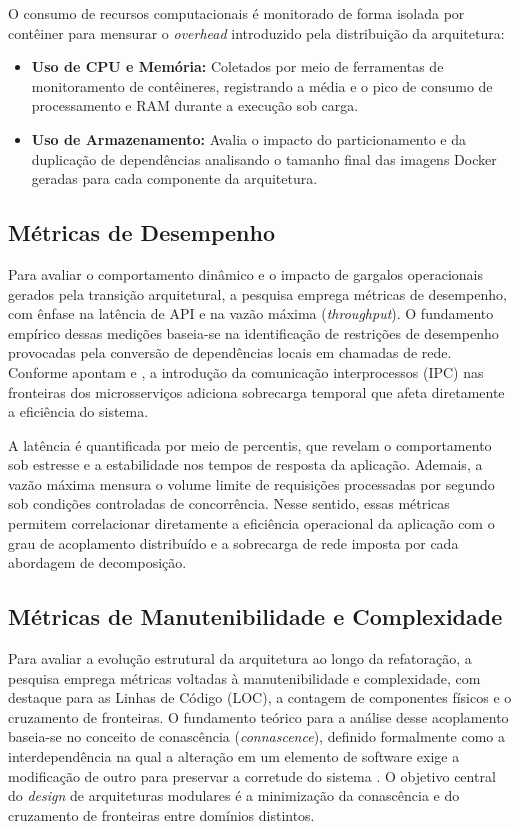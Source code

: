 O consumo de recursos computacionais é monitorado de forma isolada por contêiner para mensurar o \textit{overhead} introduzido pela distribuição da arquitetura:
\begin{itemize}
    \item \textbf{Uso de CPU e Memória:} Coletados por meio de ferramentas de monitoramento de contêineres, registrando a média e o pico de consumo de processamento e RAM durante a execução sob carga.
    \item \textbf{Uso de Armazenamento:} Avalia o impacto do particionamento e da duplicação de dependências analisando o tamanho final das imagens Docker geradas para cada componente da arquitetura.
\end{itemize}

\subsection{Métricas de Desempenho}

Para avaliar o comportamento dinâmico e o impacto de gargalos operacionais gerados pela transição arquitetural, a pesquisa emprega métricas de desempenho, com ênfase na latência de API e na vazão máxima (\textit{throughput}). O fundamento empírico dessas medições baseia-se na identificação de restrições de desempenho provocadas pela conversão de dependências locais em chamadas de rede. Conforme apontam \textcite{richardson2018} e \textcite{newman2020}, a introdução da comunicação interprocessos (IPC) nas fronteiras dos microsserviços adiciona sobrecarga temporal que afeta diretamente a eficiência do sistema.

A latência é quantificada por meio de percentis, que revelam o comportamento sob estresse e a estabilidade nos tempos de resposta da aplicação. Ademais, a vazão máxima mensura o volume limite de requisições processadas por segundo sob condições controladas de concorrência. Nesse sentido, essas métricas permitem correlacionar diretamente a eficiência operacional da aplicação com o grau de acoplamento distribuído e a sobrecarga de rede imposta por cada abordagem de decomposição.



\subsection{Métricas de Manutenibilidade e Complexidade}
\label{sec:metricas_manutenibilidade}

Para avaliar a evolução estrutural da arquitetura ao longo da refatoração, a pesquisa emprega métricas voltadas à manutenibilidade e complexidade, com destaque para as Linhas de Código (LOC), a contagem de componentes físicos e o cruzamento de fronteiras. O fundamento teórico para a análise desse acoplamento baseia-se no conceito de conascência (\textit{connascence}), definido formalmente como a interdependência na qual a alteração em um elemento de software exige a modificação de outro para preservar a corretude do sistema \cite{pagejones1992}. O objetivo central do \textit{design} de arquiteturas modulares é a minimização da conascência e do cruzamento de fronteiras entre domínios distintos.

